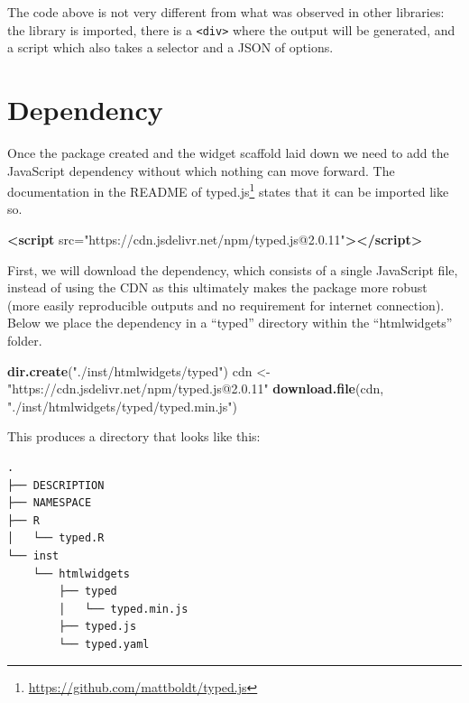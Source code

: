 \documentclass[
]{krantz}
\makeatletter
\newenvironment{Shaded}{\begin{snugshade}}{\end{snugshade}}
\newcommand{\KeywordTok}[1]{\textcolor[rgb]{0.27,0.27,0.27}{\textbf{#1}}}
\newcommand{\NormalTok}[1]{#1}
\newcommand{\OtherTok}[1]{\textcolor[rgb]{0.37,0.37,0.37}{#1}}
\newcommand{\StringTok}[1]{\textcolor[rgb]{0.5,0.5,0.5}{#1}}
\renewcommand{\href}[2]{#2\footnote{\url{#1}}}
\newenvironment{kframe}{%
\medskip{}
\setlength{\fboxsep}{.8em}
 \def\at@end@of@kframe{}%
 \ifinner\ifhmode%
  \def\at@end@of@kframe{\end{minipage}}%
  \begin{minipage}{\columnwidth}%
 \fi\fi%
 \def\FrameCommand##1{\hskip\@totalleftmargin \hskip-\fboxsep
 \colorbox{shadecolor}{##1}\hskip-\fboxsep
     \hskip-\linewidth \hskip-\@totalleftmargin \hskip\columnwidth}%
 \MakeFramed {\advance\hsize-\width
   \@totalleftmargin\z@ \linewidth\hsize
   \@setminipage}}%
 {\par\unskip\endMakeFramed%
 \at@end@of@kframe}
\renewenvironment{Shaded}{\begin{kframe}}{\end{kframe}}
\makeatother
\begin{document}
The code above is not very different from what was observed in other libraries: the library is imported, there is a \texttt{\textless{}div\textgreater{}} where the output will be generated, and a script which also takes a selector and a JSON of options.

\hypertarget{dependency}{%
\section*{Dependency}\label{dependency}}


Once the package created and the widget scaffold laid down we need to add the JavaScript dependency without which nothing can move forward. The \href{https://github.com/mattboldt/typed.js}{documentation in the README of typed.js} states that it can be imported like so.

\begin{Shaded}
\begin{Highlighting}[]
\KeywordTok{\textless{}script}\OtherTok{ src=}\StringTok{"https://cdn.jsdelivr.net/npm/typed.js@2.0.11"}\KeywordTok{\textgreater{}\textless{}/script\textgreater{}}
\end{Highlighting}
\end{Shaded}

First, we will download the dependency, which consists of a single JavaScript file, instead of using the CDN as this ultimately makes the package more robust (more easily reproducible outputs and no requirement for internet connection). Below we place the dependency in a ``typed'' directory within the ``htmlwidgets'' folder.

\begin{Shaded}
\begin{Highlighting}[]
\KeywordTok{dir.create}\NormalTok{(}\StringTok{"./inst/htmlwidgets/typed"}\NormalTok{)}
\NormalTok{cdn \textless{}{-}}\StringTok{ "https://cdn.jsdelivr.net/npm/typed.js@2.0.11"}
\KeywordTok{download.file}\NormalTok{(cdn, }\StringTok{"./inst/htmlwidgets/typed/typed.min.js"}\NormalTok{)}
\end{Highlighting}
\end{Shaded}

This produces a directory that looks like this:

\begin{verbatim}
.
├── DESCRIPTION
├── NAMESPACE
├── R
│   └── typed.R
└── inst
    └── htmlwidgets
        ├── typed
        │   └── typed.min.js
        ├── typed.js
        └── typed.yaml
\end{verbatim}
\end{document}
